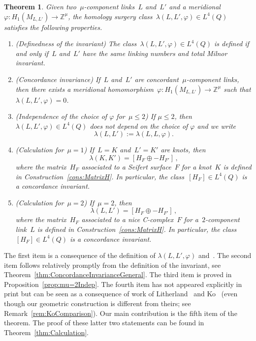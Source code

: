 \documentclass[10.9pt,a4paper]{amsart}
\newtheorem{theorem}{Theorem}[section]
\theoremstyle{definition}
\theoremstyle{remark}
\newcommand{\Z}{\mathbb{Z}}
\begin{document}
\begin{theorem}
\label{thm:ConcordanceInvarianceGeneralIntro}
Given two~$\mu$-component links~$L$ and~$L'$ and a meridional $\varphi \colon H_1(M_{L,L'}) \to \Z^\mu$,  the \emph{homology surgery class}~$\lambda(L,L',\varphi) \in L^4(Q)$ satisfies the following properties.
\begin{enumerate}
\item (Definedness of the invariant) The class~$\lambda(L,L',\varphi) \in L^4(Q)$ is defined if and only if~$L$ and~$L'$ have the same linking numbers and total Milnor invariant.
\item (Concordance invariance) If~$L$ and~$L'$ are concordant~$\mu$-component links, then there exists a meridional homomorphism~$\varphi\colon H_1(M_{L,L'}) \to \Z^\mu$ such that 
$\lambda(L,L',\varphi)=0$.
\item 
(Independence of the choice of $\varphi$ for~$\mu \leq 2$)
If $\mu \leq 2$,  then~$\lambda(L,L',\varphi) \in L^4(Q)$ does not depend on the choice of $\varphi$ and we write
$$ \lambda(L,L'):=\lambda(L,L,\varphi). $$
\item (Calculation for~$\mu=1$) If~$L=K$ and~$L'=K'$ are knots,  then 
$$\lambda(K,K')=[H_F \oplus -H_{F'}]\,,$$
where the matrix~$H_F$ associated to a Seifert surface~$F$ for a knot~$K$ is defined in Construction~\ref{cons:MatrixH}.
In particular, the class~$[H_F] \in L^4(Q)$ is a concordance invariant.
\item (Calculation for~$\mu=2$)
If~$\mu=2$, then 
$$\lambda(L,L')=[H_F \oplus -H_{F'}]\,,$$
where the matrix~$H_F$ associated to a nice C-complex~$F$ for a~$2$-component link~$L$ is defined in Construction~\ref{cons:MatrixH}.
In particular,  the class~$[H_F] \in L^4(Q)$ is a concordance invariant.
\end{enumerate}
\end{theorem}


The first item is a consequence of the definition of $\lambda(L,L',\varphi)$ and~\cite[Theorem 1.1]{DavisNagelOrsonPowell}.
The second item follows relatively promptly from the definition of the invariant, see Theorem~\ref{thm:ConcordanceInvarianceGeneral}.
The third item is proved in Proposition~\ref{prop:mu=2Indep}. The fourth item has not appeared explicitly in print but can be seen as a consequence of work of Litherland~\cite{LitherlandCobordism} and Ko~\cite{Ko2}
(even though our geometric construction is different from theirs; see Remark~\ref{rem:KoComparison}).
Our main contribution is the fifth item of the theorem.
The proof of these latter two statements can be found in Theorem~\ref{thm:Calculation}.
\end{document}
